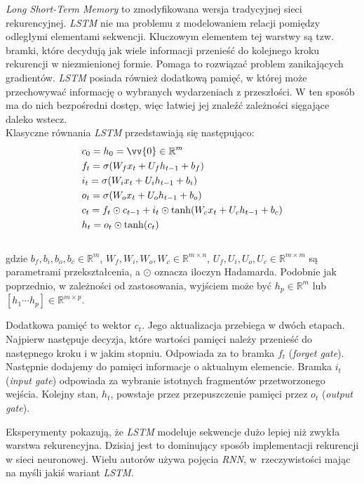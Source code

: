 \textit{Long Short-Term Memory} \cite{lstm} to zmodyfikowana wersja tradycyjnej sieci rekurencyjnej. \textit{LSTM} nie ma problemu z modelowaniem relacji pomiędzy odległymi elementami sekwencji. Kluczowym elementem tej warstwy są tzw. bramki, które decydują jak wiele informacji przenieść do kolejnego kroku rekurencji w niezmienionej formie. Pomaga to rozwiązać problem zanikających gradientów. \textit{LSTM} posiada również dodatkową pamięć, w której może przechowywać informację o wybranych wydarzeniach z przeszłości. W ten sposób ma do nich bezpośredni dostęp, więc łatwiej jej znaleźć zależności sięgające daleko wstecz.
\\
Klasyczne równania \textit{LSTM} przedstawiają się następująco:
\[
\begin{aligned}
    & c_0 = h_0 = \vv{0} \in \mathbb{R}^m \\
    & f_t = \sigma(W_f x_t + U_f h_{t-1} + b_f) \\
    & i_t = \sigma(W_i x_t + U_i h_{t-1} + b_i) \\
    & o_t = \sigma(W_o x_t + U_o h_{t-1} + b_o) \\
    & c_t = f_t \odot c_{t-1} + i_t \odot \tanh(W_c x_t + U_c h_{t-1} + b_c) \\
    & h_t = o_t \odot \tanh(c_t)
\end{aligned}
\]
\\
gdzie $b_f, b_i, b_o, b_c \in \mathbb{R}^m$, $W_f, W_i, W_o, W_c \in \mathbb{R}^{m \times n}$, $U_f, U_i, U_o, U_c \in \mathbb{R}^{m \times m}$ są parametrami przekształcenia, a $\odot$ oznacza iloczyn Hadamarda. Podobnie jak poprzednio, w zależności od zastosowania, wyjściem może być $h_p \in \mathbb{R}^m$ lub $[h_1 \dotsb h_p] \in \mathbb{R}^{m \times p}$.

Dodatkowa pamięć to wektor $c_t$. Jego aktualizacja przebiega w dwóch etapach. Najpierw następuje decyzja, które wartości pamięci należy przenieść do następnego kroku i w jakim stopniu. Odpowiada za to bramka $f_t$ (\textit{forget gate}). Następnie dodajemy do pamięci informacje o aktualnym elemencie. Bramka $i_t$ (\textit{input gate}) odpowiada za wybranie istotnych fragmentów przetworzonego wejścia. Kolejny stan, $h_t$, powstaje przez przepuszczenie pamięci przez $o_t$ (\textit{output gate}).

Eksperymenty \cite{gatesvstanh} pokazują, że \textit{LSTM} modeluje sekwencje dużo lepiej niż zwykła warstwa rekurencyjna. Dzisiaj jest to dominujący sposób implementacji rekurencji w sieci neuronowej. Wielu autorów używa pojęcia \textit{RNN}, w~rzeczywistości mając na myśli jakiś wariant \textit{LSTM}.

